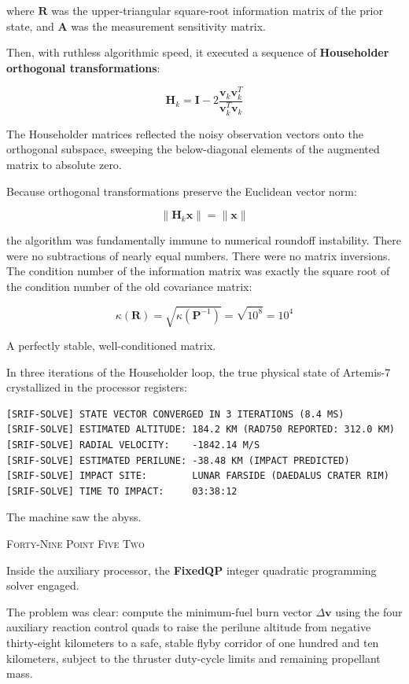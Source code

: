\documentclass[12pt,twoside,openright]{book}
\newcommand{\sceneheader}[1]{%
  \par\vspace{1.8em}%
  {\noindent\centering\scshape\large #1\par}%
  \vspace{1.0em}%
  \noindent%
}
\newcommand{\dinkus}{%
  \par\vspace{1.2em}%
  {\noindent\centering{\large $\ast\quad\ast\quad\ast$}\par}%
  \vspace{1.2em}%
  \noindent%
}
\begin{document}
where \(\mathbf{R}\) was the upper-triangular square-root information
matrix of the prior state, and \(\mathbf{A}\) was the measurement
sensitivity matrix.

Then, with ruthless algorithmic speed, it executed a sequence of
\textbf{Householder orthogonal transformations}:

\[\mathbf{H}_k = \mathbf{I} - 2 \frac{\mathbf{v}_k \mathbf{v}_k^T}{\mathbf{v}_k^T \mathbf{v}_k}\]

The Householder matrices reflected the noisy observation vectors onto
the orthogonal subspace, sweeping the below-diagonal elements of the
augmented matrix to absolute zero.

Because orthogonal transformations preserve the Euclidean vector norm:

\[\|\mathbf{H}_k \mathbf{x}\| = \|\mathbf{x}\|\]

the algorithm was fundamentally immune to numerical roundoff
instability. There were no subtractions of nearly equal numbers. There
were no matrix inversions. The condition number of the information
matrix was exactly the square root of the condition number of the old
covariance matrix:

\[\kappa(\mathbf{R}) = \sqrt{\kappa(\mathbf{P}^{-1})} = \sqrt{10^8} = 10^4\]

A perfectly stable, well-conditioned matrix.

In three iterations of the Householder loop, the true physical state of
Artemis-7 crystallized in the processor registers:

\begin{lstlisting}
[SRIF-SOLVE] STATE VECTOR CONVERGED IN 3 ITERATIONS (8.4 MS)
[SRIF-SOLVE] ESTIMATED ALTITUDE: 184.2 KM (RAD750 REPORTED: 312.0 KM)
[SRIF-SOLVE] RADIAL VELOCITY:    -1842.14 M/S
[SRIF-SOLVE] ESTIMATED PERILUNE: -38.48 KM (IMPACT PREDICTED)
[SRIF-SOLVE] IMPACT SITE:        LUNAR FARSIDE (DAEDALUS CRATER RIM)
[SRIF-SOLVE] TIME TO IMPACT:     03:38:12
\end{lstlisting}

The machine saw the abyss.

\dinkus

\sceneheader{Forty-Nine Point Five
Two}

Inside the auxiliary processor, the \textbf{FixedQP} integer quadratic
programming solver engaged.

The problem was clear: compute the minimum-fuel burn vector
\(\Delta \mathbf{v}\) using the four auxiliary reaction control quads to
raise the perilune altitude from negative thirty-eight kilometers to a
safe, stable flyby corridor of one hundred and ten kilometers, subject
to the thruster duty-cycle limits and remaining propellant mass.
\end{document}
